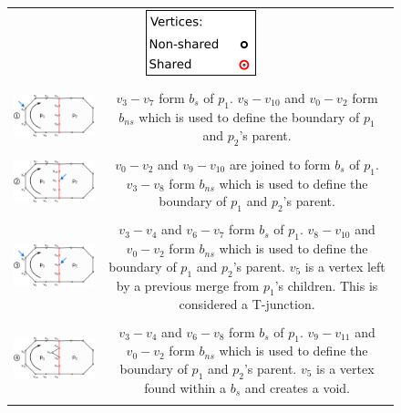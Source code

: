  \begin{figure}[p]
\centering
\scriptsize
\begin{tabularx}{1\linewidth}{c C}    
 \\ \\

\includegraphics[width=0.3\linewidth, valign=m]{images/case1v2}  &$v_3-v_7$ form $b_{s}$ of $p_1$. $v_8-v_{10}$ and $v_0-v_2$ form $b_{ns}$ which is used to define the boundary of $p_1$ and $p_2$'s parent. \\ \\

\includegraphics[width=0.3\linewidth, valign=m]{images/case2} &$v_0-v_2$ and $v_9-v_{10}$ are joined to form $b_{s}$ of $p_1$. $v_3-v_{8}$ form $b_{ns}$ which is used to define the boundary of $p_1$ and $p_2$'s parent. \\ \\

\includegraphics[width=0.3\linewidth, valign=m]{images/case5} &$v_3-v_4$ and $v_6-v_7$ form $b_{s}$ of $p_1$. $v_8-v_{10}$ and $v_0-v_2$ form $b_{ns}$ which is used to define the boundary of $p_1$ and $p_2$'s parent. $v_5$ is a vertex left by a previous merge from $p_1$'s children. This is considered a T-junction. \\ \\

\includegraphics[width=0.3\linewidth, valign=m]{images/case3} &$v_3-v_4$  and $v_6-v_8$ form $b_{s}$ of $p_1$. $v_9-v_{11}$ and $v_0-v_2$ form $b_{ns}$ which is used to define the boundary of $p_1$ and $p_2$'s parent. $v_5$ is a vertex found within a $b_{s}$ and creates a void.\\ \\


\end{tabularx}
\end{figure}
